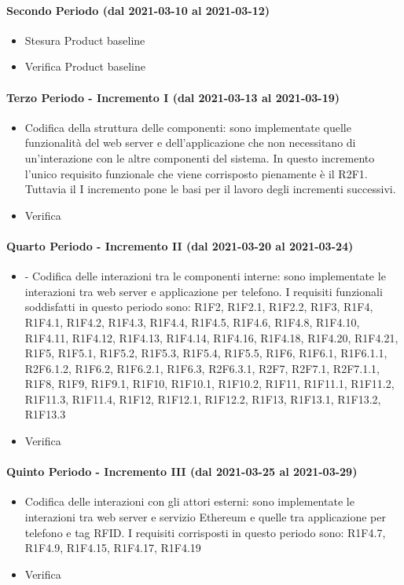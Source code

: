\paragraph{Secondo Periodo (dal 2021-03-10 al 2021-03-12)}
\begin{itemize}
	\item Stesura Product baseline
	\item Verifica Product baseline
\end{itemize}

\paragraph{Terzo Periodo - Incremento I (dal 2021-03-13 al 2021-03-19)}
\begin{itemize}
	\item Codifica della struttura delle componenti: sono implementate quelle funzionalità del web server e dell'applicazione che non necessitano di un'interazione con le altre componenti del sistema. In questo incremento l'unico requisito funzionale che viene corrisposto pienamente è il R2F1. Tuttavia il I incremento pone le basi per il lavoro degli incrementi successivi.
	\item Verifica
\end{itemize}

\paragraph{Quarto Periodo - Incremento II (dal 2021-03-20 al 2021-03-24)}
\begin{itemize}
	\item  - Codifica delle interazioni tra le componenti interne: sono implementate le interazioni tra web server e applicazione per telefono. I requisiti funzionali soddisfatti in questo periodo sono: R1F2, R1F2.1, R1F2.2, R1F3, R1F4, R1F4.1, R1F4.2, R1F4.3, R1F4.4, R1F4.5, R1F4.6, R1F4.8, R1F4.10, R1F4.11, R1F4.12, R1F4.13, R1F4.14, R1F4.16, R1F4.18, R1F4.20, R1F4.21, R1F5, R1F5.1, R1F5.2, R1F5.3, R1F5.4, R1F5.5, R1F6, R1F6.1, R1F6.1.1, R2F6.1.2, R1F6.2, R1F6.2.1, R1F6.3, R2F6.3.1, R2F7, R2F7.1, R2F7.1.1, R1F8, R1F9, R1F9.1, R1F10, R1F10.1, R1F10.2, R1F11, R1F11.1, R1F11.2, R1F11.3, R1F11.4, R1F12, R1F12.1, R1F12.2, R1F13, R1F13.1, R1F13.2, R1F13.3
	\item Verifica
\end{itemize}

\paragraph{Quinto Periodo - Incremento III (dal 2021-03-25 al 2021-03-29)}
\begin{itemize}
	\item Codifica delle interazioni con gli attori esterni: sono implementate le interazioni tra web server e servizio Ethereum e quelle tra applicazione per telefono e tag RFID.
	I requisiti corrisposti in questo periodo sono: R1F4.7, R1F4.9, R1F4.15, R1F4.17, R1F4.19
	\item Verifica
\end{itemize}

